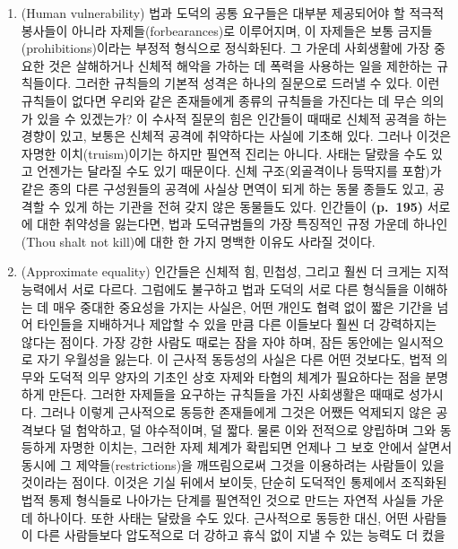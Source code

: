 \begin{enumerate}
\def\labelenumi{(\roman{enumi})}
\item
   (Human vulnerability) 법과 도덕의 공통 요구들은
  대부분 제공되어야 할 적극적 봉사들이 아니라 자제들(forbearances)로
  이루어지며, 이 자제들은 보통 금지들(prohibitions)이라는 부정적
  형식으로 정식화된다. 그 가운데 사회생활에 가장 중요한 것은 살해하거나
  신체적 해악을 가하는 데 폭력을 사용하는 일을 제한하는 규칙들이다.
  그러한 규칙들의 기본적 성격은 하나의 질문으로 드러낼 수 있다. 이런
  규칙들이 없다면 우리와 같은 존재들에게  종류의
  규칙들을 가진다는 데 무슨 의의가 있을 수 있겠는가? 이 수사적 질문의
  힘은 인간들이 때때로 신체적 공격을 하는 경향이 있고, 보통은 신체적
  공격에 취약하다는 사실에 기초해 있다. 그러나 이것은 자명한
  이치(truism)이기는 하지만 필연적 진리는 아니다. 사태는 달랐을 수도
  있고 언젠가는 달라질 수도 있기 때문이다. 신체 구조(외골격이나 등딱지를
  포함)가 같은 종의 다른 구성원들의 공격에 사실상 면역이 되게 하는 동물
  종들도 있고, 공격할 수 있게 하는 기관을 전혀 갖지 않은 동물들도 있다.
  인간들이 \textbf{(p.~195)} 서로에 대한 취약성을 잃는다면, 법과
  도덕규범들의 가장 특징적인 규정 가운데 하나인 (Thou shalt not kill)에 대한 한 가지 명백한 이유도 사라질 것이다.
\item
   (Approximate equality) 인간들은 신체적 힘,
  민첩성, 그리고 훨씬 더 크게는 지적 능력에서 서로 다르다. 그럼에도
  불구하고 법과 도덕의 서로 다른 형식들을 이해하는 데 매우 중대한
  중요성을 가지는 사실은, 어떤 개인도 협력 없이 짧은 기간을 넘어
  타인들을 지배하거나 제압할 수 있을 만큼 다른 이들보다 훨씬 더
  강력하지는 않다는 점이다. 가장 강한 사람도 때로는 잠을 자야 하며, 잠든
  동안에는 일시적으로 자기 우월성을 잃는다. 이 근사적 동등성의 사실은
  다른 어떤 것보다도, 법적 의무와 도덕적 의무 양자의 기초인 상호 자제와
  타협의 체계가 필요하다는 점을 분명하게 만든다. 그러한 자제들을
  요구하는 규칙들을 가진 사회생활은 때때로 성가시다. 그러나 이렇게
  근사적으로 동등한 존재들에게 그것은 어쨌든 억제되지 않은 공격보다 덜
  험악하고, 덜 야수적이며, 덜 짧다. 물론 이와 전적으로 양립하며 그와
  동등하게 자명한 이치는, 그러한 자제 체계가 확립되면 언제나 그 보호
  안에서 살면서 동시에 그 제약들(restrictions)을 깨뜨림으로써 그것을
  이용하려는 사람들이 있을 것이라는 점이다. 이것은 기실 뒤에서 보이듯,
  단순히 도덕적인 통제에서 조직화된 법적 통제 형식들로 나아가는 단계를
  필연적인 것으로 만드는 자연적 사실들 가운데 하나이다. 또한 사태는
  달랐을 수도 있다. 근사적으로 동등한 대신, 어떤 사람들이 다른
  사람들보다 압도적으로 더 강하고 휴식 없이 지낼 수 있는 능력도 더 컸을

\end{enumerate}
